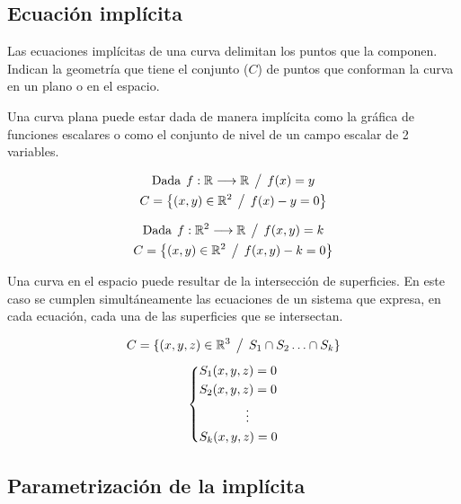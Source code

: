 \documentclass[a5paper,12pt,twoside]{book}
\begin{document}
\subsection{Ecuación implícita}

Las ecuaciones implícitas de una curva delimitan los puntos que la componen. Indican la geometría que tiene el conjunto ($C$) de puntos que conforman la curva en un plano o en el espacio.

Una curva plana puede estar dada de manera implícita como la gráfica de funciones escalares o como el conjunto de nivel de un campo escalar de 2 variables.

\begin{gather*}
    \textrm{Dada} \hspace{1ex} f:\mathbb{R} \longrightarrow \mathbb{R} \hspace{1ex} \big/ \hspace{1ex} f(x)=y
    \\
    C = { \left\{ { (x,y) \in \mathbb{R}^2 \hspace{1ex} \big/ \hspace{1ex} f(x)-y=0 } \right\} }
\end{gather*}

\begin{gather*}
    \textrm{Dada} \hspace{1ex} f:\mathbb{R}^2 \longrightarrow \mathbb{R} \hspace{1ex} \big/ \hspace{1ex} f(x,y)=k
    \\
    C = { \left\{ { (x,y) \in \mathbb{R}^2 \hspace{1ex} \big/ \hspace{1ex} f(x,y)-k=0 } \right\} }
\end{gather*}

Una curva en el espacio puede resultar de la intersección de superficies. En este caso se cumplen simultáneamente las ecuaciones de un sistema que expresa, en cada ecuación, cada una de las superficies que se intersectan.

\begin{gather*}
    C = \{ (x,y,z) \in \mathbb{R}^3 \hspace{1ex} \big/ \hspace{1ex} S_1 \cap S_2 \ldots \cap S_k \}
    \\[1ex]
    \left\{
    \begin{aligned}
        & S_1 (x,y,z)=0
        \\
        & S_2 (x,y,z)=0
        \\
        & \hspace{1.3cm} \vdots
        \\
        & S_k (x,y,z)=0
    \end{aligned}
    \right.
\end{gather*}

\subsection{Parametrización de la implícita}
\end{document}
